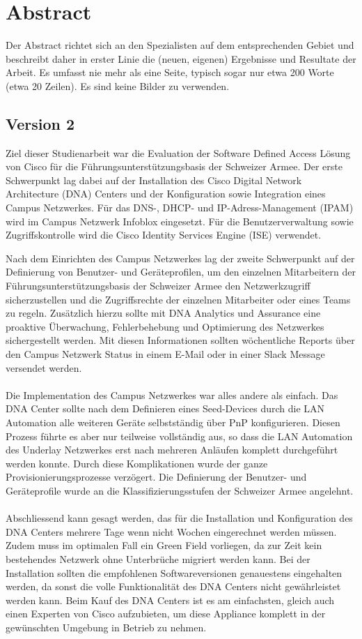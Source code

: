 \section{Abstract}
Der Abstract richtet sich an den Spezialisten auf dem entsprechenden Gebiet und 
beschreibt daher in erster Linie die (neuen, eigenen) Ergebnisse und Resultate der 
Arbeit. Es umfasst nie mehr als eine Seite, typisch sogar nur etwa 200 Worte (etwa 
20 Zeilen). Es sind keine Bilder zu verwenden.

\subsection{Version 2}

Ziel dieser Studienarbeit war die Evaluation der Software Defined Access Lösung von Cisco für die Führungsunterstützungsbasis der Schweizer Armee. Der erste Schwerpunkt lag dabei auf der Installation des Cisco Digital Network Architecture (DNA) Centers und der Konfiguration sowie Integration eines Campus Netzwerkes. Für das DNS-, DHCP- und IP-Adress-Management (IPAM) wird im Campus Netzwerk Infoblox eingesetzt. Für die Benutzerverwaltung sowie Zugriffskontrolle wird die Cisco Identity Services Engine (ISE) verwendet.

Nach dem Einrichten des Campus Netzwerkes lag der zweite Schwerpunkt auf der Definierung von Benutzer- und Geräteprofilen, um den einzelnen Mitarbeitern der Führungsunterstützungsbasis der Schweizer Armee den Netzwerkzugriff sicherzustellen und die Zugriffsrechte der einzelnen Mitarbeiter oder eines Teams zu regeln. Zusätzlich hierzu sollte mit DNA Analytics und Assurance eine proaktive Überwachung, Fehlerbehebung und Optimierung des Netzwerkes sichergestellt werden. Mit diesen Informationen sollten wöchentliche Reports über den Campus Netzwerk Status in einem E-Mail oder in einer Slack Message versendet werden.\\
\\
Die Implementation des Campus Netzwerkes war alles andere als einfach. Das DNA Center sollte nach dem Definieren eines Seed-Devices durch die LAN Automation alle weiteren Geräte selbstständig über PnP konfigurieren. Diesen Prozess führte es aber nur teilweise vollständig aus, so dass die LAN Automation des Underlay Netzwerkes erst nach mehreren Anläufen komplett durchgeführt werden konnte. Durch diese Komplikationen wurde der ganze Provisionierungsprozesse verzögert. Die Definierung der Benutzer- und Geräteprofile wurde an die Klassifizierungsstufen der Schweizer Armee angelehnt.\\
\\
Abschliessend kann gesagt werden, das für die Installation und Konfiguration des DNA Centers mehrere Tage wenn nicht Wochen eingerechnet werden müssen. Zudem muss im optimalen Fall ein Green Field vorliegen, da zur Zeit kein bestehendes Netzwerk ohne Unterbrüche migriert werden kann. Bei der Installation sollten die empfohlenen Softwareversionen genauestens eingehalten werden, da sonst die volle Funktionalität des DNA Centers nicht gewährleistet werden kann. Beim Kauf des DNA Centers ist es am einfachsten, gleich auch einen Experten von Cisco aufzubieten, um diese Appliance komplett in der gewünschten Umgebung in Betrieb zu nehmen. 

